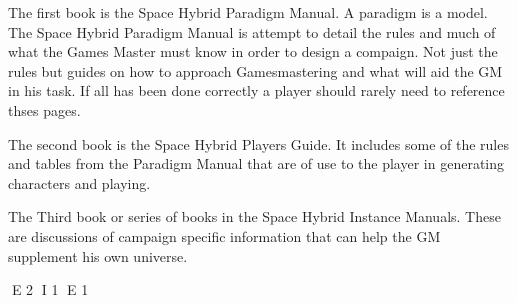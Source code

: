 The first book is the Space Hybrid Paradigm Manual. A paradigm is a model.
The Space Hybrid Paradigm Manual is attempt to detail the rules and 
much of what the Games Master must know in order to design a compaign. 
Not just the rules but guides on how to approach Gamesmastering and what will aid the 
GM in his task. If all has been done correctly a player should rarely need to reference 
thses pages.

The second book is the Space Hybrid Players Guide. It includes 
some of the rules and tables from the Paradigm Manual that are of use to
the player in generating characters and playing. 

The Third book or series of books in the Space Hybrid Instance Manuals.
These are discussions of campaign specific information that can help the
GM supplement his own universe.


E 2
I 1
E 1
